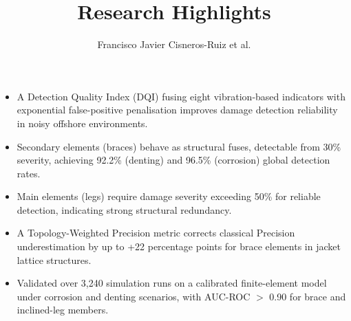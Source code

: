 \documentclass[11pt]{article}
\title{Research Highlights}
\author{Francisco Javier Cisneros-Ruiz et al.}
\date{}
\begin{document}
\maketitle

\begin{itemize}

\item A Detection Quality Index (DQI) fusing eight vibration-based indicators with exponential false-positive penalisation improves damage detection reliability in noisy offshore environments.

\item Secondary elements (braces) behave as structural fuses, detectable from 30\% severity, achieving 92.2\% (denting) and 96.5\% (corrosion) global detection rates.

\item Main elements (legs) require damage severity exceeding 50\% for reliable detection, indicating strong structural redundancy.

\item A Topology-Weighted Precision metric corrects classical Precision underestimation by up to +22 percentage points for brace elements in jacket lattice structures.

\item Validated over 3,240 simulation runs on a calibrated finite-element model under corrosion and denting scenarios, with AUC-ROC $>$ 0.90 for brace and inclined-leg members.

\end{itemize}
\end{document}
